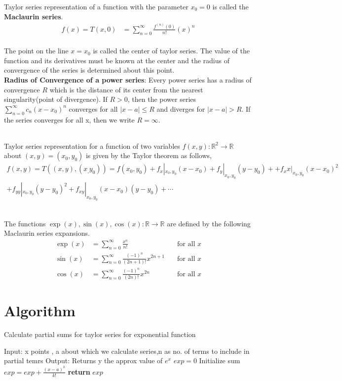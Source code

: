 \documentclass[12pt]{article}
\begin{document}
\noindent
Taylor series representation of a function with the parameter $ x_0 = 0 $ is called the \textbf{Maclaurin series}.
\begin{align}
	f(x) = T(x,0) &= \sum _{n=0}^{\infty }{\frac {f^{(n)}(0)}{n!}}(x)^{n} 
\end{align}
\\
The point on the line $ x = x_0 $ is called the center of taylor series. The value of the function and its derivatives must be known at the center and the radius of convergence of the series is determined about this point.\\[3mm]
\noindent
\textbf{Radius of Convergence of a power series}: Every power series has a radius of convergence $R$ which is the distance of its center from the nearest singularity(point of divergence).
If $R > 0$, then the power series $ \sum_{n=0}^{\infty} {c_n (x-x_0)^n}$ converges for all $ |x-a|\leq R $ and diverges for $ |x-a| > R $. If the series converges for all x, then we write $ R=\infty $. 

\noindent \\
Taylor series representation for a function of two variables $ f(x,y): \mathbb{R}^2 \rightarrow \mathbb{R} $ about $(x,y) = (x_0,y_0)$ is given by the Taylor theorem as follows,
\begin{align}
	f(x,y) = T((x,y),(x_,y_0)) = f(x_0,y_0) + f_x|_{x_0,y_0}(x-x_0) + f_y|_{x_0,y_0}(y-y_0) + + f_xx|_{x_0,y_0}(x-x_0)^2 \nonumber\\ + f_{yy}|_{x_0,y_0}(y-y_0)^2 + f_{xy}|_{x_0,y_0}(x-x_0)(y-y_0) + \cdots
\end{align}

\noindent \\
The functions $ \exp(x),\sin(x),\cos(x): \mathbb{R} \rightarrow \mathbb{R}$ are defined by the following Maclaurin series expansions.
\begin{align}
	\exp(x) &=\sum _{n=0}^{\infty }{\frac {x^n}{n!}} &\quad {\text{for all }}x\\
	\sin(x) &=\sum _{n=0}^{\infty }{\frac {(-1)^{n}}{(2n+1)!}}x^{2n+1} &\quad {\text{for all }}x\\
	\cos(x) &=\sum _{n=0}^{\infty }{\frac {(-1)^{n}}{(2n)!}}x^{2n} &\quad {\text{for all }}x
\end{align}

\section{Algorithm}

\begin{algorithm}[H]
	\caption{Calculate partial sums for taylor series for exponential function }
	\begin{algorithmic}
	  \State Input: x points , a about which we calculate series,n as no. of terms to include in partial temrs
	  \State Output: Returns y the approx value of $e^x$ 
	  \State $exp = 0$
	  \Comment Initialize sum
		 \State $exp = exp + \frac{(x-a)^{k}}{k!}$
		 \EndFor 
		 \State \textbf{return} $exp$              
	  \EndProcedure
	\end{algorithmic} 
  \end{algorithm}
  
\end{document}
